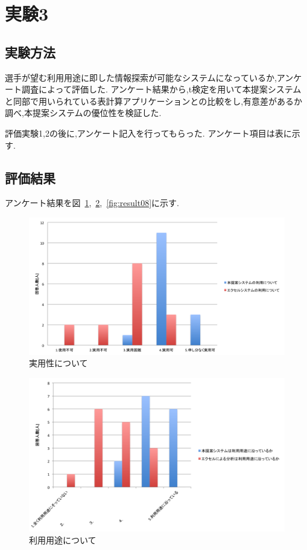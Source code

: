 \documentclass[sotsuron]{kuee}
\begin{document}
	\section{実験3}
		\subsection{実験方法}
			選手が望む利用用途に即した情報探索が可能なシステムになっているか,アンケート調査によって評価した.
			アンケート結果から,t検定を用いて本提案システムと同部で用いられている表計算アプリケーションとの比較をし,有意差があるか調べ,本提案システムの優位性を検証した.
			
			評価実験1,2の後に,アンケート記入を行ってもらった.
			アンケート項目は表に示す.
		\subsection{評価結果}
		アンケート結果を図~\ref{fig:result06},~\ref{fig:result07},~\ref{fig:result08}に示す.
			\begin{figure}
				\begin{center}
					\includegraphics[width=\linewidth]{./png/result06.png}
				\end{center}
				\caption{実用性について}
		  		\label{fig:result06}
			\end{figure}
			\begin{figure}
				\begin{center}
					\includegraphics[width=\linewidth]{./png/result07.png}
				\end{center}
				\caption{利用用途について}
		  		\label{fig:result07}
			\end{figure}
\end{document}
